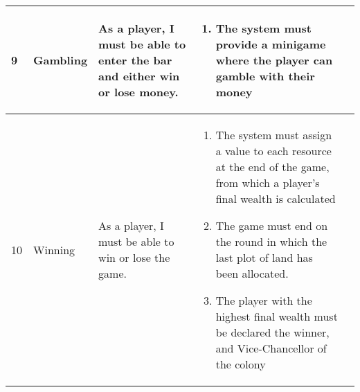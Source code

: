 \documentclass{article}
\begin{document}
\begin{landscape}
\begin{longtable}{|l||l|p{4cm}|p{8cm}|p{7cm}|}
	9 & Gambling
	& As a player, I must be able to enter the bar and either win or lose money.
	& \begin{enumerate}[label=9.1.\arabic*.]
		\item The system must provide a minigame where the player can gamble with their money
	\end{enumerate} & \\ \hline

	10 & Winning
	& As a player, I must be able to win or lose the game.
	& \begin{enumerate}[label=10.1.\arabic*.]
		\item The system must assign a value to each resource at the end of the game, from which a player's final wealth is calculated
		\item The game must end on the round in which the last plot of land has been allocated.
		\item The player with the highest final wealth must be declared the winner, and Vice-Chancellor of the colony
	\end{enumerate} & \\ \hline
	\end{longtable}
	\end{landscape}
\end{document}
